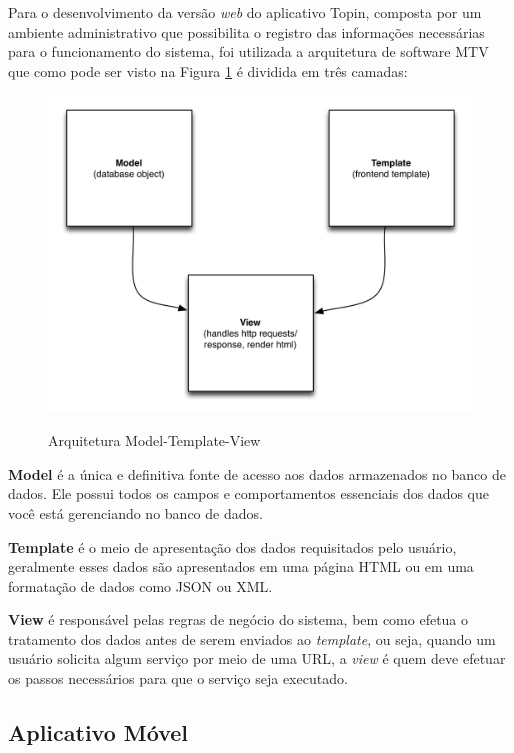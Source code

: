 {{{{Para o desenvolvimento da versão \textit{web} do aplicativo Topin, composta por um ambiente administrativo que possibilita o registro das informações necessárias para o funcionamento do sistema, foi utilizada a arquitetura de software MTV que como pode ser visto na Figura \ref{fig:model-template-view} é dividida em três camadas:

\begin{figure}[H]
\caption{Arquitetura Model-Template-View}
\centering
\includegraphics[width=.7\textwidth]{imagens/model-template-view.png}
\label{fig:model-template-view}
\end{figure}

\begin{lista}
\item \textbf{Model} é a única e definitiva fonte de acesso aos dados armazenados no banco de dados. Ele possui todos os campos e comportamentos essenciais dos dados que você está gerenciando no banco de dados.
\item \textbf{Template} é o meio de apresentação dos dados requisitados pelo usuário, geralmente esses dados são apresentados em uma página HTML ou em uma formatação de dados como JSON ou XML.
\item \textbf{View} é responsável pelas regras de negócio do sistema, bem como efetua o tratamento dos dados antes de serem enviados ao \textit{template}, ou seja, quando um usuário solicita algum serviço por meio de uma URL, a \textit{view} é quem deve efetuar os passos necessários para que o serviço seja executado.
\end{lista}

\subsection{Aplicativo Móvel}

}}}}
